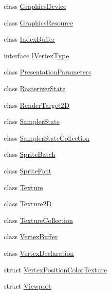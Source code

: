 \begin{DoxyCompactItemize}
\item 
class \hyperlink{classMicrosoft_1_1Xna_1_1Framework_1_1Graphics_1_1GraphicsDevice}{Graphics\+Device}
\item 
class \hyperlink{classMicrosoft_1_1Xna_1_1Framework_1_1Graphics_1_1GraphicsResource}{Graphics\+Resource}
\item 
class \hyperlink{classMicrosoft_1_1Xna_1_1Framework_1_1Graphics_1_1IndexBuffer}{Index\+Buffer}
\item 
interface \hyperlink{interfaceMicrosoft_1_1Xna_1_1Framework_1_1Graphics_1_1IVertexType}{I\+Vertex\+Type}
\item 
class \hyperlink{classMicrosoft_1_1Xna_1_1Framework_1_1Graphics_1_1PresentationParameters}{Presentation\+Parameters}
\item 
class \hyperlink{classMicrosoft_1_1Xna_1_1Framework_1_1Graphics_1_1RasterizerState}{Rasterizer\+State}
\item 
class \hyperlink{classMicrosoft_1_1Xna_1_1Framework_1_1Graphics_1_1RenderTarget2D}{Render\+Target2\+D}
\item 
class \hyperlink{classMicrosoft_1_1Xna_1_1Framework_1_1Graphics_1_1SamplerState}{Sampler\+State}
\item 
class \hyperlink{classMicrosoft_1_1Xna_1_1Framework_1_1Graphics_1_1SamplerStateCollection}{Sampler\+State\+Collection}
\item 
class \hyperlink{classMicrosoft_1_1Xna_1_1Framework_1_1Graphics_1_1SpriteBatch}{Sprite\+Batch}
\item 
class \hyperlink{classMicrosoft_1_1Xna_1_1Framework_1_1Graphics_1_1SpriteFont}{Sprite\+Font}
\item 
class \hyperlink{classMicrosoft_1_1Xna_1_1Framework_1_1Graphics_1_1Texture}{Texture}
\item 
class \hyperlink{classMicrosoft_1_1Xna_1_1Framework_1_1Graphics_1_1Texture2D}{Texture2\+D}
\item 
class \hyperlink{classMicrosoft_1_1Xna_1_1Framework_1_1Graphics_1_1TextureCollection}{Texture\+Collection}
\item 
class \hyperlink{classMicrosoft_1_1Xna_1_1Framework_1_1Graphics_1_1VertexBuffer}{Vertex\+Buffer}
\item 
class \hyperlink{classMicrosoft_1_1Xna_1_1Framework_1_1Graphics_1_1VertexDeclaration}{Vertex\+Declaration}
\item 
struct \hyperlink{structMicrosoft_1_1Xna_1_1Framework_1_1Graphics_1_1VertexPositionColorTexture}{Vertex\+Position\+Color\+Texture}
\item 
struct \hyperlink{structMicrosoft_1_1Xna_1_1Framework_1_1Graphics_1_1Viewport}{Viewport}
\end{DoxyCompactItemize}
